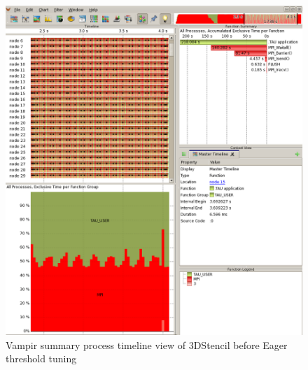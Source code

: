  \begin{figure}[tbp!]
  \centering
  \captionsetup{justification=centering}
  \includegraphics[scale=1.0,width=\columnwidth,keepaspectratio]{figures/Overlap-before}
         \caption{Vampir summary process timeline view of 3DStencil before Eager threshold tuning}
 \label{fig:beforeeager}
 \end{figure}

